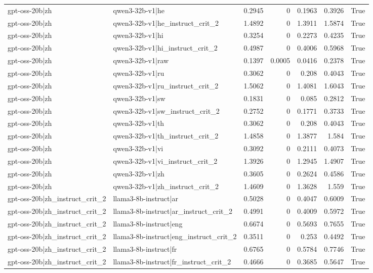 \begin{table}
\begin{tabular}{l l r r r r l}
gpt-oss-20b|zh & qwen3-32b-v1|he & 0.2945 & 0 & 0.1963 & 0.3926 & True \\
gpt-oss-20b|zh & qwen3-32b-v1|he_instruct_crit_2 & 1.4892 & 0 & 1.3911 & 1.5874 & True \\
gpt-oss-20b|zh & qwen3-32b-v1|hi & 0.3254 & 0 & 0.2273 & 0.4235 & True \\
gpt-oss-20b|zh & qwen3-32b-v1|hi_instruct_crit_2 & 0.4987 & 0 & 0.4006 & 0.5968 & True \\
gpt-oss-20b|zh & qwen3-32b-v1|raw & 0.1397 & 0.0005 & 0.0416 & 0.2378 & True \\
gpt-oss-20b|zh & qwen3-32b-v1|ru & 0.3062 & 0 & 0.208 & 0.4043 & True \\
gpt-oss-20b|zh & qwen3-32b-v1|ru_instruct_crit_2 & 1.5062 & 0 & 1.4081 & 1.6043 & True \\
gpt-oss-20b|zh & qwen3-32b-v1|sw & 0.1831 & 0 & 0.085 & 0.2812 & True \\
gpt-oss-20b|zh & qwen3-32b-v1|sw_instruct_crit_2 & 0.2752 & 0 & 0.1771 & 0.3733 & True \\
gpt-oss-20b|zh & qwen3-32b-v1|th & 0.3062 & 0 & 0.208 & 0.4043 & True \\
gpt-oss-20b|zh & qwen3-32b-v1|th_instruct_crit_2 & 1.4858 & 0 & 1.3877 & 1.584 & True \\
gpt-oss-20b|zh & qwen3-32b-v1|vi & 0.3092 & 0 & 0.2111 & 0.4073 & True \\
gpt-oss-20b|zh & qwen3-32b-v1|vi_instruct_crit_2 & 1.3926 & 0 & 1.2945 & 1.4907 & True \\
gpt-oss-20b|zh & qwen3-32b-v1|zh & 0.3605 & 0 & 0.2624 & 0.4586 & True \\
gpt-oss-20b|zh & qwen3-32b-v1|zh_instruct_crit_2 & 1.4609 & 0 & 1.3628 & 1.559 & True \\
gpt-oss-20b|zh_instruct_crit_2 & llama3-8b-instruct|ar & 0.5028 & 0 & 0.4047 & 0.6009 & True \\
gpt-oss-20b|zh_instruct_crit_2 & llama3-8b-instruct|ar_instruct_crit_2 & 0.4991 & 0 & 0.4009 & 0.5972 & True \\
gpt-oss-20b|zh_instruct_crit_2 & llama3-8b-instruct|eng & 0.6674 & 0 & 0.5693 & 0.7655 & True \\
gpt-oss-20b|zh_instruct_crit_2 & llama3-8b-instruct|eng_instruct_crit_2 & 0.3511 & 0 & 0.253 & 0.4492 & True \\
gpt-oss-20b|zh_instruct_crit_2 & llama3-8b-instruct|fr & 0.6765 & 0 & 0.5784 & 0.7746 & True \\
gpt-oss-20b|zh_instruct_crit_2 & llama3-8b-instruct|fr_instruct_crit_2 & 0.4666 & 0 & 0.3685 & 0.5647 & True \\

\end{tabular}
\end{table}
